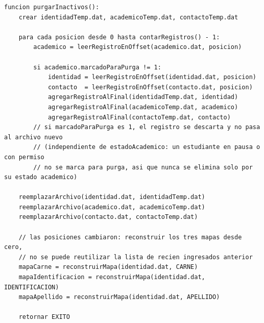 \begin{lstlisting}[style=pseudocodigo]
funcion purgarInactivos():
    crear identidadTemp.dat, academicoTemp.dat, contactoTemp.dat

    para cada posicion desde 0 hasta contarRegistros() - 1:
        academico = leerRegistroEnOffset(academico.dat, posicion)

        si academico.marcadoParaPurga != 1:
            identidad = leerRegistroEnOffset(identidad.dat, posicion)
            contacto  = leerRegistroEnOffset(contacto.dat, posicion)
            agregarRegistroAlFinal(identidadTemp.dat, identidad)
            agregarRegistroAlFinal(academicoTemp.dat, academico)
            agregarRegistroAlFinal(contactoTemp.dat, contacto)
        // si marcadoParaPurga es 1, el registro se descarta y no pasa al archivo nuevo
        // (independiente de estadoAcademico: un estudiante en pausa o con permiso
        // no se marca para purga, asi que nunca se elimina solo por su estado academico)

    reemplazarArchivo(identidad.dat, identidadTemp.dat)
    reemplazarArchivo(academico.dat, academicoTemp.dat)
    reemplazarArchivo(contacto.dat, contactoTemp.dat)

    // las posiciones cambiaron: reconstruir los tres mapas desde cero,
    // no se puede reutilizar la lista de recien ingresados anterior
    mapaCarne = reconstruirMapa(identidad.dat, CARNE)
    mapaIdentificacion = reconstruirMapa(identidad.dat, IDENTIFICACION)
    mapaApellido = reconstruirMapa(identidad.dat, APELLIDO)

    retornar EXITO
\end{lstlisting}
